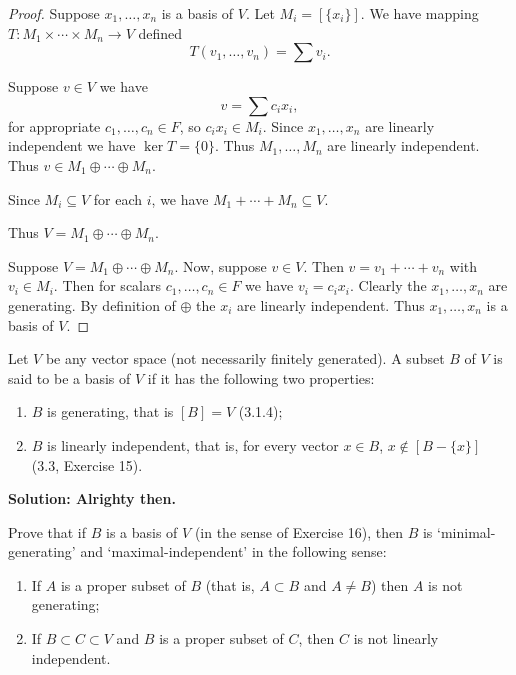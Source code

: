 \begin{proof}
    \underbar{\textbf{($\longrightarrow$)}}
    Suppose $x_1, \ldots, x_n$ is a basis of $V$.
    Let $M_i = [\{x_i\}]$. We have mapping $T : M_1 \times \cdots \times M_n \longrightarrow V$ defined 
    \[T(v_1, \ldots, v_n) = \sum v_i.\]

    Suppose $v \in V$ we have 
    \[v = \sum c_i x_i,\]
    for appropriate $c_1, \ldots, c_n \in F$, so $c_i x_i \in M_i$.
    Since $x_1, \ldots, x_n$ are linearly independent
        we have $\ker T = \{0\}$. Thus $M_1, \ldots, M_n$ are linearly independent.
    Thus $v \in  M_1 \oplus \cdots \oplus M_n$.

    Since $M_i \subseteq V$ for each $i$, we have 
    $M_1 + \cdots + M_n \subseteq V$.

    Thus $V = M_1 \oplus \cdots \oplus M_n$.

    \underbar{\textbf{($\longleftarrow$)}}
    Suppose $V = M_1 \oplus \cdots \oplus M_n$.
    Now, suppose $v \in V$.
    Then $v = v_1 + \cdots + v_n$ with $v_i \in M_i$.
    Then for scalars $c_1, \ldots, c_n \in F$ we have 
    $v_i = c_i x_i$.
    Clearly the $x_1, \ldots, x_n$ are generating.
    By definition of $\oplus$ the $x_i$ are linearly independent.
    Thus $x_1, \ldots, x_n$ is a basis of $V$.
\end{proof}

\begin{tcolorbox}[title=Problem 16, breakable]
    Let $V$ be any vector space (not necessarily finitely generated).
    A subset $B$ of $V$ is said to be a basis of $V$ if it has the following two properties:
    \begin{enumerate}
        \item $B$ is generating, that is $[B] = V$ (3.1.4);
        \item $B$ is linearly independent, that is, for every vector $x \in B$, $x \notin [B - \{x\}]$ (3.3, Exercise 15).
    \end{enumerate}
\end{tcolorbox}

\textbf{Solution: Alrighty then.}

\begin{tcolorbox}[title=Problem 17, breakable]
    Prove that if $B$ is a basis of $V$ (in the sense 
    of Exercise 16), then $B$ is `minimal-generating' and `maximal-independent' in the following sense:
    \begin{enumerate}
        \item If $A$ is a proper subset of $B$ (that is, $A \subset B$ and $A \ne B$) then $A$ is not generating;
        \item If $B \subset C \subset V$ and $B$ is a proper subset of $C$, then $C$ is not linearly independent.
    \end{enumerate}
\end{tcolorbox}

